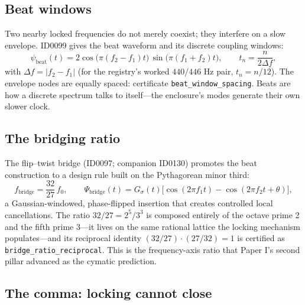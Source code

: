 \documentclass[11pt]{article}
\theoremstyle{remark}
\begin{document}
\subsection{Beat windows}

Two nearby locked frequencies do not merely coexist; they interfere on a slow envelope. ID0099 gives the beat waveform and its discrete coupling windows:
\begin{equation}
\psi_{\mathrm{beat}}(t) = 2\cos\big(\pi(f_2 - f_1)t\big)\,\sin\big(\pi(f_1 + f_2)t\big), \qquad
t_n = \frac{n}{2\Delta f},
\label{eq:beat}
\end{equation}
with $\Delta f = |f_2 - f_1|$ (for the registry's worked $440/446$ Hz pair, $t_n = n/12$). The envelope nodes are equally spaced: certificate \texttt{beat\_window\_spacing}. Beats are how a discrete spectrum talks to itself---the enclosure's modes generate their own slower clock.

\subsection{The bridging ratio}

The flip--twist bridge (ID0097; companion ID0130) promotes the beat construction to a design rule built on the Pythagorean minor third:
\begin{equation}
f_{\mathrm{bridge}} = \frac{32}{27}\, f_0, \qquad
\Psi_{\mathrm{bridge}}(t) = G_\sigma(t)\Big[ \cos(2\pi f_1 t) - \cos(2\pi f_2 t + \theta) \Big],
\label{eq:bridge}
\end{equation}
a Gaussian-windowed, phase-flipped insertion that creates controlled local cancellations. The ratio $32/27 = 2^5/3^3$ is composed entirely of the octave prime 2 and the fifth prime 3---it lives on the same rational lattice the locking mechanism populates---and its reciprocal identity $(32/27) \cdot (27/32) = 1$ is certified as \texttt{bridge\_ratio\_reciprocal}. This is the frequency-axis ratio that Paper I's second pillar advanced as the cymatic prediction.

\subsection{The comma: locking cannot close}
\end{document}
